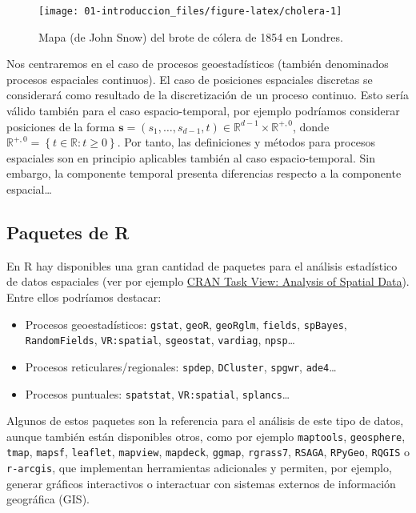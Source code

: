 \documentclass[
  spanish,
]{book}
\theoremstyle{break}
\begin{document}
\begin{itemize}
  \begin{figure}[!htb]

  {\centering \texttt{[image: 01-introduccion\_files/figure-latex/cholera-1]} 

  }

  \caption{Mapa (de John Snow) del brote de cólera de 1854 en Londres.}\label{fig:cholera}
  \end{figure}
\end{itemize}

Nos centraremos en el caso de procesos geoestadísticos (también denominados procesos espaciales continuos).
El caso de posiciones espaciales discretas se considerará como resultado de la discretización de un proceso continuo.
Esto sería válido también para el caso espacio-temporal, por ejemplo podríamos considerar posiciones de la forma \(\mathbf{s}=(s_{1} , \ldots,s_{d-1} ,t) \in \mathbb{R}^{d-1} \times \mathbb{R}^{+,0}\), donde \(\mathbb{R}^{+,0} = \left\{ t \in \mathbb{R} : t \geq 0 \right\}\).
Por tanto, las definiciones y métodos para procesos espaciales son en principio aplicables también al caso espacio-temporal.
Sin embargo, la componente temporal presenta diferencias respecto a la componente espacial\ldots{}

\hypertarget{paquetes-r}{%
\subsection{Paquetes de R}\label{paquetes-r}}

En R hay disponibles una gran cantidad de paquetes para el análisis estadístico de datos espaciales (ver por ejemplo \href{http://cran.r-project.org/web/views/Spatial.html}{CRAN Task View: Analysis of Spatial Data}).
Entre ellos podríamos destacar:

\begin{itemize}
\item
  Procesos geoestadísticos: \texttt{gstat}, \texttt{geoR}, \texttt{geoRglm}, \texttt{fields},
  \texttt{spBayes}, \texttt{RandomFields}, \texttt{VR:spatial}, \texttt{sgeostat}, \texttt{vardiag}, \texttt{npsp}\ldots{}
\item
  Procesos reticulares/regionales: \texttt{spdep}, \texttt{DCluster}, \texttt{spgwr},
  \texttt{ade4}\ldots{}
\item
  Procesos puntuales: \texttt{spatstat}, \texttt{VR:spatial}, \texttt{splancs}\ldots{}
\end{itemize}

Algunos de estos paquetes son la referencia para el análisis de este tipo de datos,
aunque también están disponibles otros, como por ejemplo \texttt{maptools}, \texttt{geosphere}, \texttt{tmap}, \texttt{mapsf}, \texttt{leaflet}, \texttt{mapview}, \texttt{mapdeck}, \texttt{ggmap}, \texttt{rgrass7}, \texttt{RSAGA}, \texttt{RPyGeo}, \texttt{RQGIS} o \texttt{r-arcgis}, que implementan herramientas adicionales y permiten, por ejemplo, generar gráficos interactivos o interactuar con sistemas externos de información geográfica (GIS).
\end{document}
